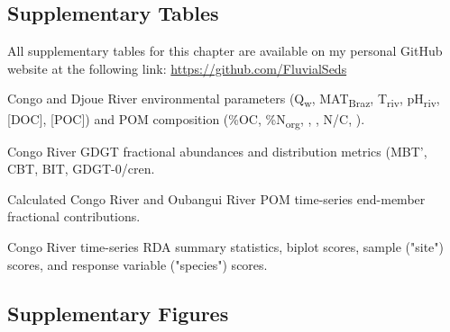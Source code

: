 \clearpage

\subsection{Supplementary Tables}

\renewcommand\thetable{\thechapter.S\arabic{table}}    
\setcounter{table}{0}  

\captionsetup[table]{justification=raggedright,singlelinecheck=off}

All supplementary tables for this chapter are available on my personal GitHub website at the following link: \url{https://github.com/FluvialSeds}

\begin{table}[h!]
	\caption[Congo and Djoue River environmental and POM measurements]{Congo and Djoue River environmental parameters (Q\textsubscript{w}, MAT\textsubscript{Braz}, T\textsubscript{riv}, pH\textsubscript{riv}, [DOC], [POC]) and POM composition (\%OC, \%N\textsubscript{org}, , , N/C, ).}
	\label{Ch5Tab:S1} 
\end{table}

\begin{table}[h!]
	\caption[Congo River GDGT fractional abundances and metrics]{Congo River GDGT fractional abundances and distribution metrics (MBT', CBT, BIT, GDGT-0/cren.}
	\label{Ch5Tab:S2} 
\end{table}

\begin{table}[h!]
	\caption[End-member fractional contributions]{Calculated Congo River and Oubangui River POM time-series end-member fractional contributions.}
	\label{Ch5Tab:S3} 
\end{table}

\begin{table}[h!]
	\caption[RDA summary statistics and scores]{Congo River time-series RDA summary statistics, biplot scores, sample ("site") scores, and response variable ("species") scores.}
	\label{Ch5Tab:S4} 
\end{table}

\renewcommand\thetable{\thechapter.\arabic{table}}

\captionsetup[table]{justification=justified}

\clearpage

\subsection{Supplementary Figures}
\renewcommand\thefigure{\thechapter.S\arabic{figure}}    
\setcounter{figure}{0}  

